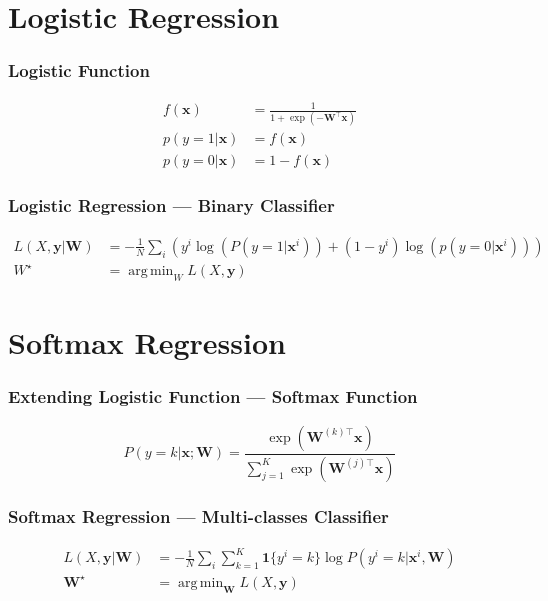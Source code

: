 \documentclass{beamer}
\DeclareMathOperator*{\argmin}{arg\,min}
\begin{document}
\section{Logistic Regression}

\begin{frame}
  \frametitle{Logistic Function}

  \begin{align*}
    f(\mathbf{x})&=\frac{1}{1+\exp(-\mathbf{W}^{\top}\mathbf{x})} \\
    p(y=1|\mathbf{x})&=f(\mathbf{x})\\
    p(y=0|\mathbf{x})&=1-f(\mathbf{x})
  \end{align*}
\end{frame}

\begin{frame}
  \frametitle{Logistic Regression --- Binary Classifier}

  \begin{align*}
    L(X, \mathbf{y}|\mathbf{W})&=-\frac{1}{N}\sum_{i}\left(y^{i}\log(P(y=1|\mathbf{x}^{i}))+(1-y^{i})\log(p(y=0|\mathbf{x}^{i}))\right) \\
    W^{\star}&=\argmin_{W}L(X, \mathbf{y})
  \end{align*}
\end{frame}

\section{Softmax Regression}

\begin{frame}
  \frametitle{Extending Logistic Function --- Softmax Function}

  \begin{equation*}
    P(y=k|\mathbf{x}; \mathbf{W})=\frac{\exp(\mathbf{W}^{(k)\top}\mathbf{x})}{\sum_{j=1}^{K}\exp(\mathbf{W}^{(j)\top}\mathbf{x})}
  \end{equation*}
\end{frame}

\begin{frame}
  \frametitle{Softmax Regression --- Multi-classes Classifier}

  \begin{align*}
    L(X, \mathbf{y}|\mathbf{W})&=-\frac{1}{N}\sum_{i}\sum_{k=1}^{K}\mathbf{1}\{y^{i}=k\}\log P(y^{i}=k|\mathbf{x}^{i}, \mathbf{W}) \\
    \mathbf{W}^{\star}&=\argmin_{\mathbf{W}}L(X, \mathbf{y})
  \end{align*}
\end{frame}
\end{document}
